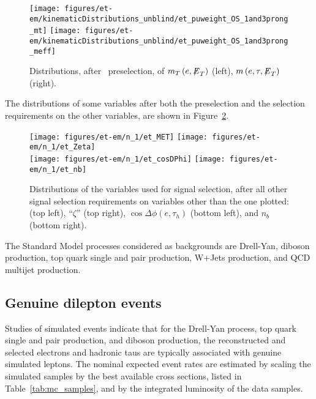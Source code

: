 \begin{figure}[thbp!]\centering
  \texttt{[image: figures/et-em/kinematicDistributions\_unblind/et\_puweight\_OS\_1and3prong\_mt]}
  \texttt{[image: figures/et-em/kinematicDistributions\_unblind/et\_puweight\_OS\_1and3prong\_meff]} \\
  \caption{\label{fig:et_preselection_distributions3} Distributions,
    after \teth ~preselection, of $m_{T}\left(e, {\not\mathrel{E}}_T\right)$
    (left), $m\left(e, \tau, {\not\mathrel{E}}_T\right)$ (right).}
\end{figure}

The distributions of some variables after both the preselection and the
selection requirements on the other variables, are shown in
Figure~\ref{fig:et_nm1_distributions}.

\begin{figure}[thbp!]\centering
  \texttt{[image: figures/et-em/n\_1/et\_MET]}
  \texttt{[image: figures/et-em/n\_1/et\_Zeta]} \\
  \texttt{[image: figures/et-em/n\_1/et\_cosDPhi]}
  \texttt{[image: figures/et-em/n\_1/et\_nb]}
  \caption{\label{fig:et_nm1_distributions} Distributions of the
    variables used for \teth signal selection, after all other signal
    selection requirements on variables other than the one plotted:
    \ETslash (top left), ``$\zeta$'' (top right), $\cos{\Delta \phi
      (e,\tau_{h})}$ (bottom left), and $n_b$ (bottom right).}
\end{figure}

The Standard Model processes considered as backgrounds are Drell-Yan,
diboson production, top quark single and pair production, W+Jets
production, and QCD multijet production.

\subsection{Genuine dilepton events}

Studies of simulated events indicate that for the Drell-Yan process, top
quark single and pair production, and diboson production, the
reconstructed and selected electrons and hadronic taus are typically
associated with genuine simulated leptons.  The nominal expected event
rates are estimated by scaling the simulated samples by the best
available cross sections, listed in Table~\ref{tab:mc_samples}, and by
the integrated luminosity of the data samples.

